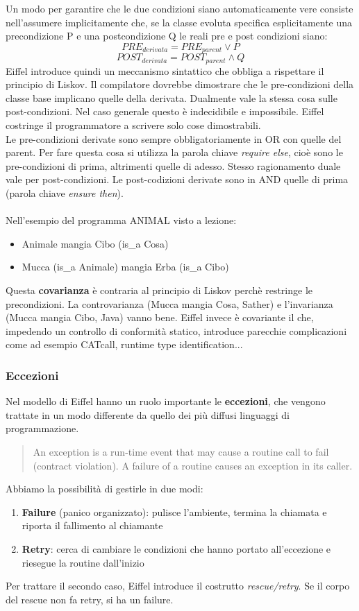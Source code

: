 Un modo per garantire che le due condizioni siano automaticamente vere consiste nell'assumere implicitamente che, se la classe evoluta specifica esplicitamente una precondizione P e una postcondizione Q le reali pre e post condizioni siano:
\[PRE_{derivata}= PRE_{parent} \lor P\]
\[POST_{derivata} = POST_{parent} \land Q\]
Eiffel introduce quindi un meccanismo sintattico che obbliga a rispettare il principio di Liskov. Il compilatore dovrebbe dimostrare che le pre-condizioni della classe base implicano quelle della derivata. Dualmente vale la stessa cosa sulle post-condizioni. Nel caso generale questo è indecidibile e impossibile. Eiffel costringe il programmatore a scrivere solo cose dimostrabili.\\ 
Le pre-condizioni derivate sono sempre obbligatoriamente in OR con quelle del parent. Per fare questa cosa si utilizza la parola chiave \textit{require else}, cioè sono le pre-condizioni di prima, altrimenti quelle di adesso. Stesso ragionamento duale vale per post-condizioni. Le post-codizioni derivate sono in AND quelle di prima (parola chiave \textit{ensure then}). \\\\
Nell'esempio del programma ANIMAL visto a lezione:
\begin{itemize}
    \item Animale mangia Cibo (is\_a Cosa)
    \item Mucca (is\_a Animale) mangia Erba (is\_a Cibo)
\end{itemize}
Questa \textbf{covarianza} è contraria al principio di Liskov perchè restringe le precondizioni. La controvarianza (Mucca mangia Cosa, Sather) e l'invarianza (Mucca mangia Cibo, Java) vanno bene. Eiffel invece è covariante il che, impedendo un controllo di conformità statico, introduce parecchie complicazioni come ad esempio CATcall, runtime type identification...\\

\subsubsection{Eccezioni}
Nel modello di Eiffel hanno un ruolo importante le \textbf{eccezioni}, che vengono trattate in un modo differente da quello dei più diffusi linguaggi di programmazione.
\begin{quote}
    An exception is a run-time event that may cause a routine call to fail (contract violation). A failure of a routine causes an exception in its caller.
\end{quote}
Abbiamo la possibilità di gestirle in due modi:
\begin{enumerate}
    \item \textbf{Failure} (panico organizzato): pulisce l'ambiente, termina la chiamata e riporta il fallimento al chiamante
    \item \textbf{Retry}: cerca di cambiare le condizioni che hanno portato all'eccezione e riesegue la routine dall'inizio
\end{enumerate}
Per trattare il secondo caso, Eiffel introduce il costrutto \textit{rescue/retry}. Se il corpo del rescue non fa retry, si ha un failure.


